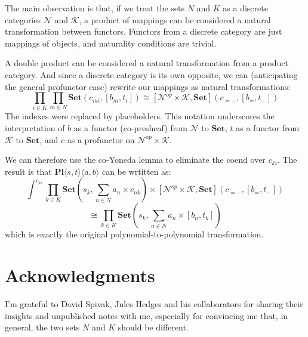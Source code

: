 \documentclass[11pt]{amsart}
\begin{document}
The main observation is that, if we treat the sets $N$ and $K$ as a discrete categories $\mathcal{N}$ and $\mathcal{K}$, a product of mappings can be considered a natural transformation between functors. Functors from a discrete category are just mappings of objects, and naturality conditions are trivial. 


A double product can be considered a natural transformation from a product category. And since a discrete category is its own opposite, we can (anticipating the general profunctor case) rewrite our mappings as natural transformations:
\[ \prod_{i \in K} \prod_{m \in N} \mathbf{Set} \left(c_{m i}, [b_m, t_i] \right) \cong 
[\mathcal{N}^{op} \times \mathcal{K}, \mathbf{Set}]\left(c_{= -}, [b_=, t_- ]\right)\]
The indexes were replaced by placeholders. This notation underscores the interpretation of $b$ as a functor (co-presheaf) from $\mathcal{N}$ to $\mathbf{Set}$,  $t$ as a functor from $\mathcal{K}$ to $\mathbf{Set}$, and $c$ as a profunctor on $\mathcal{N}^{op} \times \mathcal{K}$.

 
 We can therefore use the co-Yoneda lemma to eliminate the coend over $c_{ki}$. The result is that $\mathbf{Pl}\langle s, t\rangle \langle a, b\rangle$ can be wrtitten as:
 \[ \int^{c_{k i}} 
 \prod_{k \in K} \mathbf{Set} \left(s_k,  \sum_{n \in N} a_n \times c_{n k} \right) \times 
 [\mathcal{N}^{op} \times \mathcal{K}, \mathbf{Set}]\left(c_{= -}, [b_=, t_- ]\right) \]
\[
\cong  \prod_{k \in K} \mathbf{Set}\left(s_k, \sum_{n \in N} a_n \times [b_n, t_k] \right)
 \]
which is exactly the original polynomial-to-polynomial transformation.

\section{Acknowledgments}
I'm grateful to David Spivak, Jules Hedges and his collaborators for sharing their insights and unpublished notes with me, especially for convincing me that, in general, the two sets $N$ and $K$ should be different.
        
\end{document}
